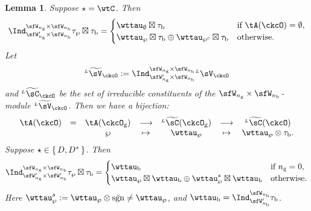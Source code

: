 \documentclass[12pt,a4paper]{amsart}
\newcommand{\sgn}{\operatorname{sgn}}
\numberwithin{equation}{section}
\newtheorem{lem}[thm]{Lemma}
\theoremstyle{remark}
\def\LV{{}^{\scriptscriptstyle L}\sV}
\def\LV{{}^{\scriptscriptstyle L}\sV}
\def\tLV{{}^{\scriptscriptstyle L}\widetilde{\sV}}
\def\tLC{{}^{\scriptscriptstyle L}\widetilde{\sC}}
\def\brsgn{\breve{\sgn}}
\begin{document}
\begin{lem}\label{lem:WLcell}
  Suppose $\star=\wtC$.  Then
  \[
    \Ind_{\sfW'_{n_{\mathrm g}}\times \sfW_{n_{\mathrm b}}}^{\sfW_{n_{\mathrm g}}\times \sfW_{n_{\mathrm b}}} \tau_{\wp}\boxtimes \tau_{\mathrm b} =
    \begin{cases}
       \wttau_{\emptyset}\boxtimes \tau_{\mathrm b} & \text{if } \tA(\ckcO) =\emptyset,\\
      \wttau_{\wp}\boxtimes \tau_{\mathrm b} \oplus \wttau_{\wp^{c}}\boxtimes \tau_{\mathrm b}
      &\text{otherwise}.
    \end{cases}
  \]
Let
\[
  \tLV_{\ckcO}:= \Ind_{\sfW'_{n_{\mathrm g}}\times \sfW_{n_{\mathrm b}}}^{\sfW_{n_{\mathrm g}}\times \sfW_{n_{\mathrm b}}}\LV_{\ckcO}
\]
and $\tLC_{\ckcO}$ be the set of irreducible constituents of the
$\sfW_{n_{\mathrm g}}\times \sfW_{n_{\mathrm b}}$-module $\tLV_{\ckcO}$. Then we have a
bijection:
  \[
      \begin{array}{lccccccc}
        \tA(\ckcO)&=&\tA(\ckcO_{\mathrm g}) & \longrightarrow & \tLC(\ckcO_{\mathrm g})
        & \longrightarrow & \tLC(\ckcO)\\
                  &  &\wp & \mapsto & \wttau_{\wp}
        & \mapsto & \wttau_{\wp}\otimes \tau_{\mathrm b}.
      \end{array}
  \]
  Suppose $\star\in\set{D,D^{*}}$. Then
  \[
    \Ind_{\sfW'_{n_{\mathrm g}}\times \sfW'_{n_{\mathrm b}}}^{\sfW_{n_{\mathrm g}}\times \sfW_{n_{\mathrm b}}} \tau_{\wp}\boxtimes \tau_{\mathrm b} =
    \begin{cases}
      \wttau_{\mathrm b} & \text{if } n_{\mathrm g}=0,\\
      \wttau_{\wp}\boxtimes \wttau_{\mathrm b}  \oplus \wttau_{\wp}^{s}\boxtimes \wttau_{\mathrm b}
      &\text{otherwise}.
    \end{cases}
  \]
  Here $\wttau_{\wp}^{s}:= \wttau_{\wp}\otimes \brsgn \neq \wttau_{\wp}$, and $\wttau_{\mathrm b} = \Ind_{\sfW'_{n_{\mathrm b}}}^{\sfW_{n_{\mathrm b}}}\tau_{\mathrm b}$.

\end{lem}
\end{document}
